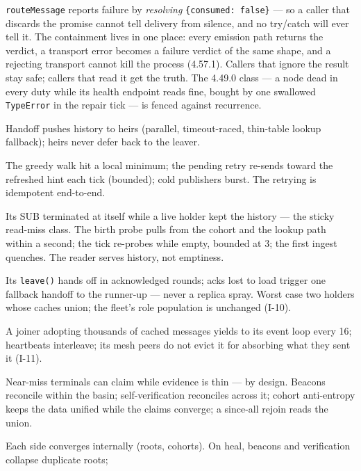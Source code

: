 \documentclass[nobib]{tufte-handout}
\begin{document}
\begin{description}
  \texttt{routeMessage} reports failure by \emph{resolving}
  \texttt{\{consumed:\,false\}} --- so a caller that discards the
  promise cannot tell delivery from silence, and no try/catch will ever
  tell it. The containment lives in one place: every emission path
  returns the verdict, a transport error becomes a failure verdict of
  the same shape, and a rejecting transport cannot kill the process
  (4.57.1). Callers that ignore the result stay safe; callers that read
  it get the truth. The 4.49.0 class --- a node dead in every duty while
  its health endpoint reads fine, bought by one swallowed
  \texttt{TypeError} in the repair tick --- is fenced against
  recurrence.
\item[The root leaves gracefully.] Handoff pushes history to heirs
  (parallel, timeout-raced, thin-table lookup fallback); heirs never
  defer back to the leaver.
\item[A publish strands.] The greedy walk hit a local minimum; the
  pending retry re-sends toward the refreshed hint each tick (bounded);
  cold publishers burst. The retrying is idempotent end-to-end.
\item[A cold reader becomes an empty root.] Its SUB terminated at
  itself while a live holder kept the history --- the sticky read-miss
  class. The birth probe pulls from the cohort and the lookup path
  within a second; the tick re-probes while empty, bounded at 3; the
  first ingest quenches. The reader serves history, not emptiness.
\item[A burst publisher churns out under load.] Its \texttt{leave()}
  hands off in acknowledged rounds; acks lost to load trigger one
  fallback handoff to the runner-up --- never a replica spray. Worst
  case two holders whose caches union; the fleet's role population is
  unchanged (I-10).
\item[History arrives in bulk.] A joiner adopting thousands of cached
  messages yields to its event loop every 16; heartbeats interleave;
  its mesh peers do not evict it for absorbing what they sent it
  (I-11).
\item[Two roots exist transiently.] Near-miss terminals can claim while
  evidence is thin --- by design. Beacons reconcile within the basin;
  self-verification reconciles across it; cohort anti-entropy keeps the
  data unified while the claims converge; a since-all rejoin reads the
  union.
\item[The network partitions.] Each side converges internally (roots,
  cohorts). On heal, beacons and verification collapse duplicate roots;

\end{description}
\end{document}
